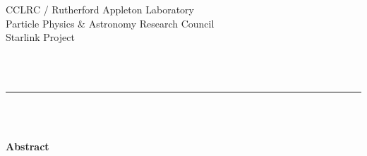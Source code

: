 \begin{latexonly}
   CCLRC / {\sc Rutherford Appleton Laboratory} \hfill {\bf \stardocname}\\
   {\large Particle Physics \& Astronomy Research Council}\\
   {\large Starlink Project\\}
   {\large \stardoccategory\ \stardocnumber}
   \begin{flushright}
   \stardocauthors\\
   \stardocdate
   \end{flushright}
   \vspace{-4mm}
   \rule{\textwidth}{0.5mm}
   \vspace{5mm}
   \begin{center}
   {\Huge\bf  \stardoctitle \\ [2.5ex]}
   {\LARGE\bf \stardocversion \\ [4ex]}
   {\Huge\bf  \stardocmanual}
   \end{center}
   \vspace{5mm}

   \vspace{10mm}
   \begin{center}
      {\Large\bf Abstract}
   \end{center}
\end{latexonly}

